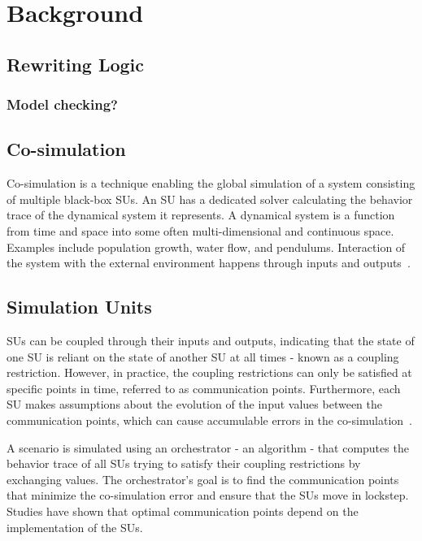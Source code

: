 \section{Background}\label{sc:background}
\subsection{Rewriting Logic}

\subsubsection{Model checking?}


\subsection{Co-simulation}
Co-simulation is a technique enabling the global simulation of a system consisting of multiple black-box SUs. 
An SU has a dedicated solver calculating the behavior trace of the dynamical system it represents. 
A dynamical system is a function from time and space into some often multi-dimensional and continuous space. Examples include population growth, water flow, and pendulums. 
Interaction of the system with the external environment happens through inputs and outputs~\cite{Gomes2019a,Kubler2000}.

\subsection{Simulation Units}
SUs can be coupled through their inputs and outputs, indicating that the state of one SU is reliant on the state of another SU at all times - known as a coupling restriction. However, in practice, the coupling restrictions can only be satisfied at specific points in time, referred to as communication points. Furthermore, each SU makes assumptions about the evolution of the input values between the communication points, which can cause accumulable errors in the co-simulation~\cite{Arnold2014}. 

A scenario is simulated using an orchestrator - an algorithm - that computes the behavior trace of all SUs trying to satisfy their coupling restrictions by exchanging values. 
The orchestrator's goal is to find the communication points that minimize the co-simulation error and ensure that the SUs move in lockstep. 
Studies \cite{Gomes2019,Oakes2021,Gomes2018f,Schweizer2015c,Gomes2018a} have shown that optimal communication points depend on the implementation of the SUs.

